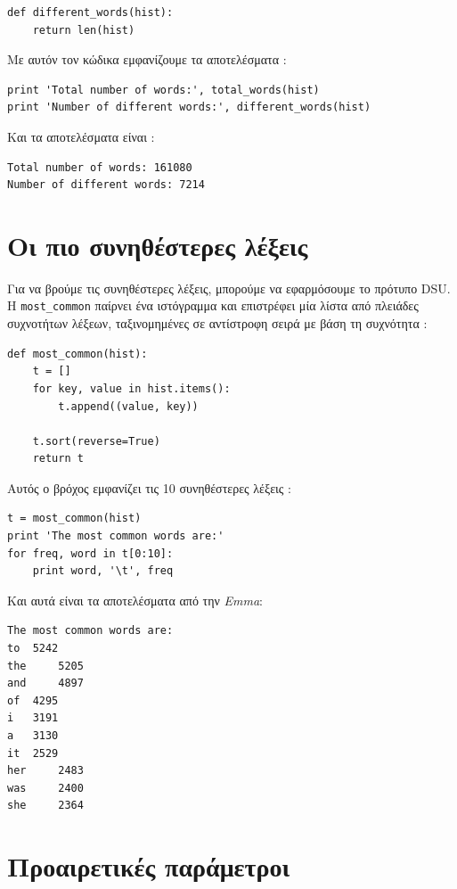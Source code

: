 \documentclass[10pt]{book}
\begin{document}
\begin{verbatim}
def different_words(hist):
    return len(hist)
\end{verbatim}
%
 Με αυτόν τον κώδικα εμφανίζουμε τα αποτελέσματα :

\begin{verbatim}
print 'Total number of words:', total_words(hist)
print 'Number of different words:', different_words(hist)
\end{verbatim}
%
 Και τα αποτελέσματα είναι :

\begin{verbatim}
Total number of words: 161080
Number of different words: 7214
\end{verbatim}
%

 
\section{Οι πιο συνηθέστερες λέξεις}

Για να βρούμε τις συνηθέστερες λέξεις, μπορούμε να εφαρμόσουμε το πρότυπο  DSU.  Η  \verb"most_common"  παίρνει ένα ιστόγραμμα και επιστρέφει μία λίστα από πλειάδες συχνοτήτων λέξεων, ταξινομημένες σε αντίστροφη σειρά με βάση τη συχνότητα :

\begin{verbatim}
def most_common(hist):
    t = []
    for key, value in hist.items():
        t.append((value, key))

    t.sort(reverse=True)
    return t
\end{verbatim}
%
 Αυτός ο βρόχος εμφανίζει τις 10 συνηθέστερες λέξεις :

\begin{verbatim}
t = most_common(hist)
print 'The most common words are:'
for freq, word in t[0:10]:
    print word, '\t', freq
\end{verbatim}
%
 Και αυτά είναι τα αποτελέσματα από την  {\em Emma}:

\begin{verbatim}
The most common words are:
to 	5242
the 	5205
and 	4897
of 	4295
i 	3191
a 	3130
it 	2529
her 	2483
was 	2400
she 	2364
\end{verbatim}
%

 
\section{Προαιρετικές παράμετροι}
\end{document}
